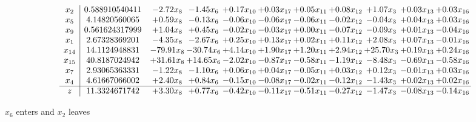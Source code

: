 \documentclass[9pt]{article}
\begin{document}
 \[\begin{array}{c| c c@{\hskip 2pt} c@{\hskip 2pt} c@{\hskip 2pt} c@{\hskip 2pt} c@{\hskip 2pt} c@{\hskip 2pt} c@{\hskip 2pt} c@{\hskip 2pt} c@{\hskip 2pt} }
 x_{2}   &  0.588910540411 & -2.72 x_{8} & -1.45 x_{6} & +  0.17 x_{10} & +  0.03 x_{17} & +  0.05 x_{11} & +  0.08 x_{12} & +  1.07 x_{3} & +  0.03 x_{13} & +  0.03 x_{16}\\
 x_{5}   &  4.14820560065 & +  0.59 x_{8} & -0.13 x_{6} & -0.06 x_{10} & -0.06 x_{17} & -0.06 x_{11} & -0.02 x_{12} & -0.04 x_{3} & +  0.04 x_{13} & +  0.03 x_{16}\\
 x_{9}   &  0.561624317999 & +  1.04 x_{8} & +  0.45 x_{6} & -0.02 x_{10} & -0.03 x_{17} & +  0.00 x_{11} & -0.07 x_{12} & -0.09 x_{3} & +  0.01 x_{13} & -0.04 x_{16}\\
 x_{1}   &  2.67328369201 & -4.35 x_{8} & -2.67 x_{6} & +  0.25 x_{10} & +  0.13 x_{17} & +  0.02 x_{11} & +  0.11 x_{12} & +  2.08 x_{3} & +  0.07 x_{13} & -0.01 x_{16}\\
 x_{14}   &  14.1124948831 & -79.91 x_{8} & -30.74 x_{6} & +  4.14 x_{10} & +  1.90 x_{17} & +  1.20 x_{11} & +  2.94 x_{12} & + 25.70 x_{3} & +  0.19 x_{13} & +  0.24 x_{16}\\
 x_{15}   &  40.8187024942 & + 31.61 x_{8} & + 14.65 x_{6} & -2.02 x_{10} & -0.87 x_{17} & -0.58 x_{11} & -1.19 x_{12} & -8.48 x_{3} & -0.69 x_{13} & -0.58 x_{16}\\
 x_{7}   &  2.93065363331 & -1.22 x_{8} & -1.10 x_{6} & +  0.06 x_{10} & +  0.04 x_{17} & -0.05 x_{11} & +  0.03 x_{12} & +  0.12 x_{3} & -0.01 x_{13} & +  0.03 x_{16}\\
 x_{4}   &  4.61667066002 & +  2.40 x_{8} & +  0.84 x_{6} & -0.15 x_{10} & -0.08 x_{17} & -0.02 x_{11} & -0.12 x_{12} & -1.43 x_{3} & +  0.02 x_{13} & +  0.02 x_{16}\\
\hline
z    &  11.3324671742 & +  3.30 x_{8} & +  0.77 x_{6} & -0.42 x_{10} & -0.11 x_{17} & -0.51 x_{11} & -0.27 x_{12} & -1.47 x_{3} & -0.08 x_{13} & -0.14 x_{16}\\
\end{array}\]


 $ x_{6} $ enters and $ x_{2} $ leaves 
\end{document}

